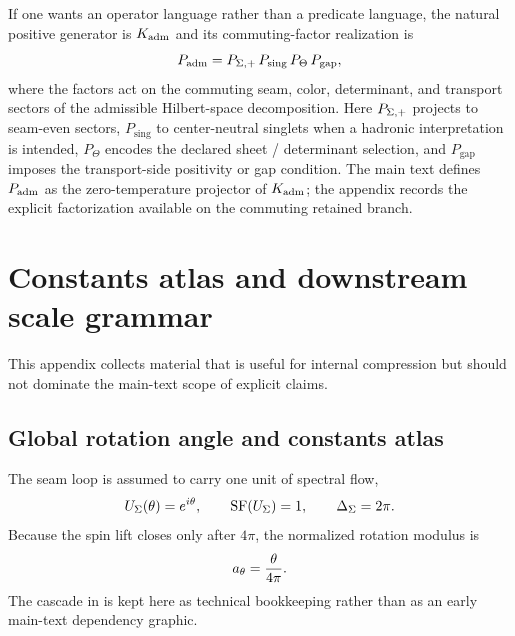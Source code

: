 \begin{remark}
If one wants an operator language rather than a predicate language, the natural positive generator is $K_{\mathrm{adm}}$ and its commuting-factor realization is
\[
P_{\mathrm{adm}}=P_{\Sigma,+}\,P_{\mathrm{sing}}\,P_{\Theta}\,P_{\mathrm{gap}},
\]
where the factors act on the commuting seam, color, determinant, and transport sectors of the admissible Hilbert-space decomposition. Here $P_{\Sigma,+}$ projects to seam-even sectors, $P_{\mathrm{sing}}$ to center-neutral singlets when a hadronic interpretation is intended, $P_{\Theta}$ encodes the declared sheet / determinant selection, and $P_{\mathrm{gap}}$ imposes the transport-side positivity or gap condition. The main text defines $P_{\mathrm{adm}}$ as the zero-temperature projector of $K_{\mathrm{adm}}$; the appendix records the explicit factorization available on the commuting retained branch.
\end{remark}

\section{Constants atlas and downstream scale grammar}
\label{app:constants}

This appendix collects material that is useful for internal compression but should not dominate the main-text scope of explicit claims.

\subsection{Global rotation angle and constants atlas}

The seam loop is assumed to carry one unit of spectral flow,
\[
U_{\Sigma}(\theta)=e^{i\theta},
\qquad
\operatorname{SF}(U_{\Sigma})=1,
\qquad
\Delta_{\Sigma}=2\pi.
\]
Because the spin lift closes only after $4\pi$, the normalized rotation modulus is
\[
a_\theta=\frac{\theta}{4\pi}.
\]
The cascade in  is kept here as technical bookkeeping rather than as an early main-text dependency graphic.

